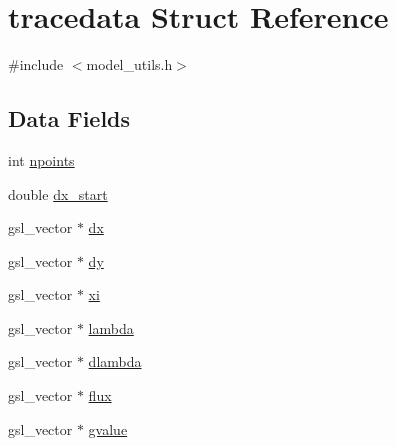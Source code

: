 \hypertarget{structtracedata}{
\section{tracedata Struct Reference}
\label{structtracedata}
}


{\ttfamily \#include $<$model\_\-utils.h$>$}\subsection*{Data Fields}
\begin{DoxyCompactItemize}
\item 
int \hyperlink{structtracedata_af5aed7b8f1629b86be33dc7d57056bcc}{npoints}
\item 
double \hyperlink{structtracedata_a30448278ba94615e1ef5d8801deab6e6}{dx\_\-start}
\item 
gsl\_\-vector $\ast$ \hyperlink{structtracedata_aebca3378cacc91654b164c7818f120e2}{dx}
\item 
gsl\_\-vector $\ast$ \hyperlink{structtracedata_a0bdd805ca59eb0b1329694181236c191}{dy}
\item 
gsl\_\-vector $\ast$ \hyperlink{structtracedata_aee169f9a7859629a3f3b9e8a58c43a39}{xi}
\item 
gsl\_\-vector $\ast$ \hyperlink{structtracedata_a3c594775ee8672308604497766a66f02}{lambda}
\item 
gsl\_\-vector $\ast$ \hyperlink{structtracedata_a63bce5a9b367504eb09b87f41f3373da}{dlambda}
\item 
gsl\_\-vector $\ast$ \hyperlink{structtracedata_a536ca0eb0a785814fc211bcf835f666a}{flux}
\item 
gsl\_\-vector $\ast$ \hyperlink{structtracedata_a263d2f1a51308e73d79c77f5e62c01fb}{gvalue}
\end{DoxyCompactItemize}


